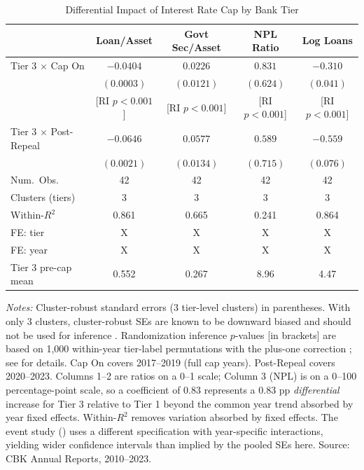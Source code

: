 \begin{table}[!h]
\centering
\caption{Differential Impact of Interest Rate Cap by Bank Tier}
\label{tab:main_did}
\begin{threeparttable}
\begin{tabular}{lcccc}
\toprule
& Loan/Asset & Govt Sec/Asset & NPL Ratio & Log Loans \\
\midrule
Tier 3 $\times$ Cap On & $-0.0404$ & $0.0226$ & $0.831$ & $-0.310$ \\
& $(0.0003)$ & $(0.0121)$ & $(0.624)$ & $(0.041)$ \\
& {[RI $p < 0.001$]} & {[RI $p < 0.001$]} & {[RI $p < 0.001$]} & {[RI $p < 0.001$]} \\
Tier 3 $\times$ Post-Repeal & $-0.0646$ & $0.0577$ & $0.589$ & $-0.559$ \\
& $(0.0021)$ & $(0.0134)$ & $(0.715)$ & $(0.076)$ \\
\midrule
Num.\ Obs. & 42 & 42 & 42 & 42 \\
Clusters (tiers) & 3 & 3 & 3 & 3 \\
Within-$R^2$ & 0.861 & 0.665 & 0.241 & 0.864 \\
FE: tier & X & X & X & X \\
FE: year & X & X & X & X \\
Tier 3 pre-cap mean & 0.552 & 0.267 & 8.96 & 4.47 \\
\bottomrule
\end{tabular}
\begin{tablenotes}[flushleft]
\small
\item \textit{Notes:} Cluster-robust standard errors (3 tier-level clusters) in parentheses.
With only 3 clusters, cluster-robust SEs are known to be downward biased and should not be used for inference \citep{cameron2008bootstrap}.
Randomization inference $p$-values [in brackets] are based on 1,000 within-year tier-label permutations with the plus-one correction \citep{phipson2010permutation}; see  for details.
Cap On covers 2017--2019 (full cap years). Post-Repeal covers 2020--2023.
Columns 1--2 are ratios on a 0--1 scale; Column 3 (NPL) is on a 0--100 percentage-point scale, so a coefficient of 0.83 represents a 0.83 pp \textit{differential} increase for Tier 3 relative to Tier 1 beyond the common year trend absorbed by year fixed effects.
Within-$R^2$ removes variation absorbed by fixed effects.
The event study () uses a different specification with year-specific interactions, yielding wider confidence intervals than implied by the pooled SEs here.
Source: CBK Annual Reports, 2010--2023.
\end{tablenotes}
\end{threeparttable}
\end{table}
